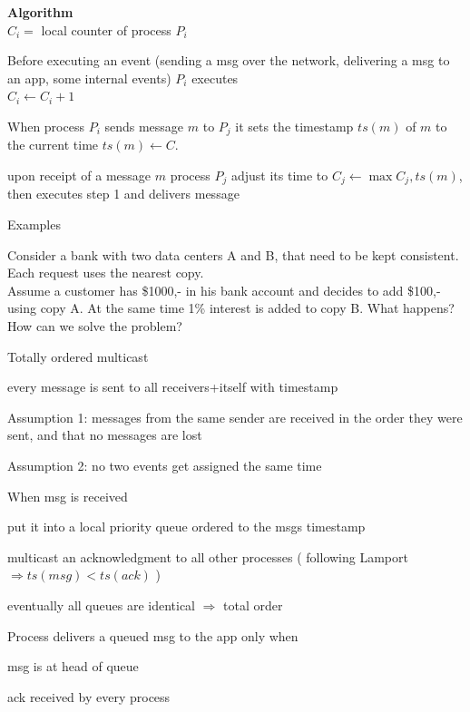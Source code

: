 \documentclass[ngerman,a4paper]{report}
\begin{document}
\textbf{Algorithm} \\
 $C_i =$ local counter of process $P_i$
 
\begin{compactenum}
\item Before executing an event (sending a msg over the network, delivering a msg to an app, some internal events) $P_i$ executes\\
$C_i \leftarrow C_i + 1$
\item When process $P_i$ sends message $m$ to $P_j$ it sets the timestamp $ts(m)$ of $m$ to the current time $ts(m) \leftarrow C$.
\item upon receipt of a message $m$ process $P_j$ adjust its time to $C_j \leftarrow \max{C_j, ts(m)}$, then executes step 1 and delivers message
\end{compactenum}

Examples
\begin{compactitem}
\item Consider a bank with two data centers A and B, that need to be kept consistent. Each request uses the nearest copy. \\
Assume a customer has \$1000,- in his bank account and decides to add \$100,- using copy A. At the same time 1\% interest is added to copy B. What happens? How can we solve the problem?


\item Totally ordered multicast

\begin{compactitem}
	\item  every message is sent to all receivers+itself with timestamp
	\item Assumption 1: messages from the same sender are received in the order they were sent, and that no messages are lost
	\item Assumption 2: no two events get assigned the same time
	\item When msg is received 
	\begin{compactenum}
		\item put it into a local priority queue ordered to the msgs timestamp
		\item multicast an acknowledgment to all other processes ( following Lamport $\Rightarrow ts(msg) < ts(ack)$ )
	\end{compactenum}
	
	\item eventually all queues are identical $\Rightarrow$ total order
	\item Process delivers a queued msg to the app only when
	\begin{compactenum}
		\item msg is at head of queue
		\item ack received by every process
	\end{compactenum}

\end{compactitem}

\end{compactitem}
\end{document}
